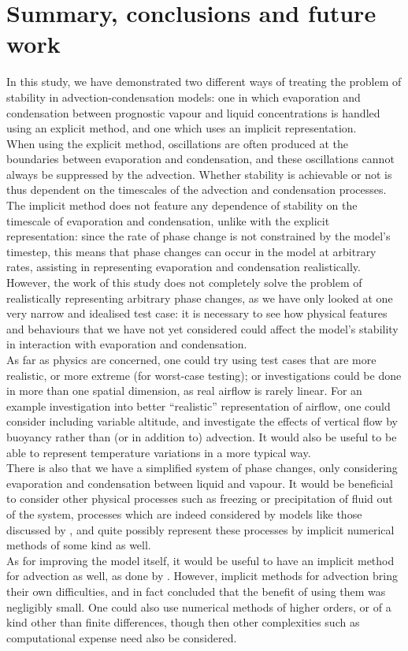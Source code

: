 \documentclass[11pt]{article}
\begin{document}
\section{Summary, conclusions and future work}
In this study, we have demonstrated two different ways of treating the problem of stability in advection-condensation models: one in which evaporation and condensation between prognostic vapour and liquid concentrations is handled using an explicit method, and one which uses an implicit representation. \\
When using the explicit method, oscillations are often produced at the boundaries between evaporation and condensation, and these oscillations cannot always be suppressed by the advection. Whether stability is achievable or not is thus dependent on the timescales of the advection and condensation processes. \\
The implicit method does not feature any dependence of stability on the timescale of evaporation and condensation, unlike with the explicit representation: since the rate of phase change is not constrained by the model's timestep, this means that phase changes can occur in the model at arbitrary rates, assisting in representing evaporation and condensation realistically. \\
However, the work of this study does not completely solve the problem of realistically representing arbitrary phase changes, as we have only looked at one very narrow and idealised test case: it is necessary to see how physical features and behaviours that we have not yet considered could affect the model's stability in interaction with evaporation and condensation. \\
As far as physics are concerned, one could try using test cases that are more realistic, or more extreme (for worst-case testing); or investigations could be done in more than one spatial dimension, as real airflow is rarely linear. For an example investigation into better ``realistic'' representation of airflow, one could consider including variable altitude, and investigate the effects of vertical flow by buoyancy rather than (or in addition to) advection. It would also be useful to be able to represent temperature variations in a more typical way. \\
There is also that we have a simplified system of phase changes, only considering evaporation and condensation between liquid and vapour. It would be beneficial to consider other physical processes such as freezing or precipitation of fluid out of the system, processes which are indeed considered by models like those discussed by \citet{Wilson2008}, and quite possibly represent these processes by implicit numerical methods of some kind as well. \\
As for improving the model itself, it would be useful to have an implicit method for advection as well, as done by \citet{GS1990}. However, implicit methods for advection bring their own difficulties, and \citeauthor{GS1990} in fact concluded that the benefit of using them was negligibly small. One could also use numerical methods of higher orders, or of a kind other than finite differences, though then other complexities such as computational expense need also be considered.

\newpage


\end{document}

